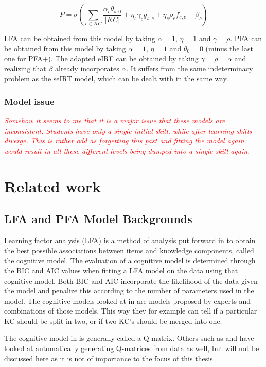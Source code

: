 \documentclass{scrartcl}
\newcommand\todo[1]{\textit{\textcolor{red}{#1}}}
\begin{document}
\begin{equation}
P = \sigma(\sum_{c \in KC}\frac{\alpha_c \theta_{s,0}}{|KC|}+\eta_{s} \gamma_{c} g_{s,c} + \eta_{s}\rho_{c} f_{s,c} - \beta_{c})
\end{equation}

LFA can be obtained from this model by taking $\alpha=1$, $\eta=1$ and $\gamma=\rho$. PFA can be obtained from this model by taking $\alpha=1$, $\eta=1$ and $\theta_{0}=0$ (minus the last one for PFA+). The adapted eIRF can be obtained by taking $\gamma=\rho=\alpha$ and realizing that $\beta$ already incorporates $\alpha$. It suffers from the same indeterminacy problem as the seIRT model, which can be dealt with in the same way.

\subsubsection{Model issue}
\todo{Somehow it seems to me that it is a major issue that these models are inconsistent: Students have only a single initial skill, while after learning skills diverge. This is rather odd as forgetting this past and fitting the model again would result in all these different levels being dumped into a single skill again.}


\section{Related work}
\label{sec:RW}
\subsection{LFA and PFA Model Backgrounds}
Learning factor analysis (LFA) is a method of analysis put forward in \cite{lfa} to obtain the best possible associations between items and knowledge components, called the cognitive model. The evaluation of a cognitive model is determined through the BIC and AIC values when fitting a LFA model on the data using that cognitive model. Both BIC and AIC incorporate the likelihood of the data given the model and penalize this according to the number of parameters used in the model. The cognitive models looked at in \cite{lfa} are models proposed by experts and combinations of those models. This way they for example can tell if a particular KC should be split in two, or if two KC's should be merged into one.

The cognitive model in \cite{lfa} is generally called a Q-matrix. Others such as \cite{qm1} and \cite{qm2} have looked at automatically generating Q-matrices from data as well, but will not be discussed here as it is not of importance to the focus of this thesis.
\end{document}
